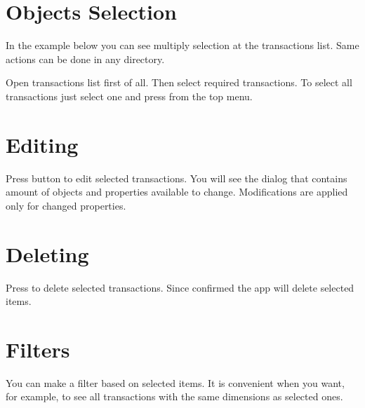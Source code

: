 \documentclass[a4paper,10pt,english]{sphinxmanual}
\begin{document}
\section{Objects Selection}
\label{\detokenize{bulk-actions:objects-selection}}
\sphinxAtStartPar
In the example below you can see multiply selection at the transactions list. Same actions can be done in
any directory.

\noindent{}

\noindent{}

\noindent{}

\sphinxAtStartPar
Open transactions list first of all. Then select required transactions.
To select all transactions just select one and press  from the top menu.


\section{Editing}
\label{\detokenize{bulk-actions:editing}}
\sphinxAtStartPar
Press  button to edit selected transactions. You will see the dialog that
contains amount of objects and properties available to change. Modifications are applied
only for changed properties.

\noindent{}

\noindent{}


\section{Deleting}
\label{\detokenize{bulk-actions:deleting}}
\sphinxAtStartPar
Press  to delete selected transactions. Since confirmed the app will delete
selected items.

\noindent{}

\noindent{}


\section{Filters}
\label{\detokenize{bulk-actions:filters}}
\sphinxAtStartPar
You can make a filter based on selected items. It is convenient when you want, for example,
to see all transactions with the same dimensions as selected ones.
\end{document}
